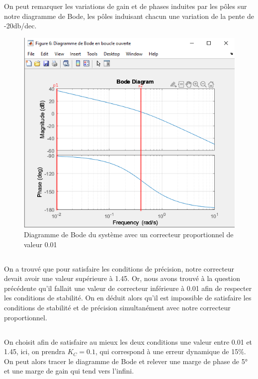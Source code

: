 \documentclass{article}
\begin{document}
On peut remarquer les variations de gain et de phases induites par les pôles sur notre diagramme de Bode, les pôles induisant chacun une variation de la pente de -20db/dec.
\begin{figure}[h]
    \centering
    \includegraphics[width=0.5\linewidth]{bode124_2.PNG}
    \caption{Diagramme de Bode du système avec un correcteur proportionnel de valeur 0.01}
\end{figure}
\subsection{}
On a trouvé que pour satisfaire les conditions de précision, notre correcteur devait avoir une valeur supérieure à 1.45. Or, nous avons trouvé à la question précédente qu'il fallait une valeur de correcteur inférieure à 0.01 afin de respecter les conditions de stabilité. On en déduit alors qu'il est impossible de satisfaire les conditions de stabilité et de précision simultanément avec notre correcteur proportionnel.
\subsection{}
On choisit afin de satisfaire au mieux les deux conditions une valeur entre 0.01 et 1.45, ici, on prendra $K_C=0.1$, qui correspond à une erreur dynamique de 15\%.
On peut alors tracer le diagramme de Bode et relever une marge de phase de 5° et une marge de gain qui tend vers l'infini.
\end{document}
